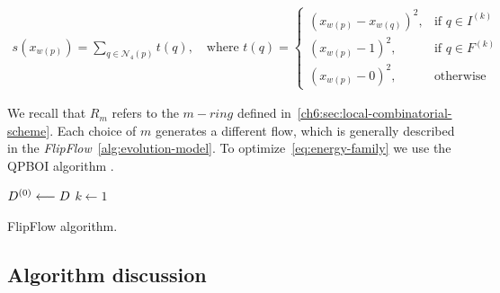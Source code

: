 \begin{align}
  s(x_{w(p)})=\sum_{q \in \mathcal{N}_4(p)}{ t(q) }, \quad \text{where } t(q) = \left\{\begin{array}{ll}
  (x_{w(p)}-x_{w(q)})^2, & \text{if } q \in I^{(k)}\\
  (x_{w(p)}-1)^2, & \text{if } q \in F^{(k)}\\
  (x_{w(p)}-0)^2, & \text{otherwise }
  \end{array}\right.
  \label{eq:length-penalization}
\end{align}


We recall that $R_m$ refers to the $m-ring$ defined in~\cref{ch6:sec:local-combinatorial-scheme}. Each choice of $m$ generates a different flow, which is generally described in the \emph{FlipFlow}~\cref{alg:evolution-model}. To optimize~\cref{eq:energy-family} we use the QPBOI algorithm \cite{rother07qpbo}.


\begin{algorithm}
 
 \BlankLine
 $D^{(0)} \longleftarrow D$\;
 $k \longleftarrow 1$\;
 \caption{FlipFlow algorithm.}
 \label{alg:evolution-model}  
\end{algorithm}

\subsection{Algorithm discussion}
\label{ch7:subsec:flipflow-algorithm-discussion}

